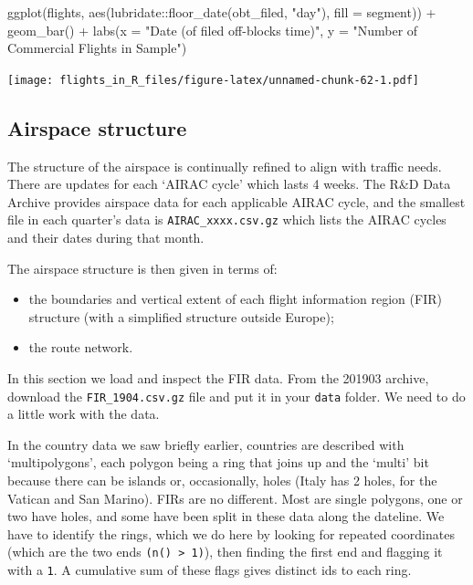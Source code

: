 \documentclass[
]{book}
\newenvironment{Shaded}{\begin{snugshade}}{\end{snugshade}}
\newcommand{\AttributeTok}[1]{\textcolor[rgb]{0.77,0.63,0.00}{#1}}
\newcommand{\FunctionTok}[1]{\textcolor[rgb]{0.00,0.00,0.00}{#1}}
\newcommand{\NormalTok}[1]{#1}
\newcommand{\SpecialCharTok}[1]{\textcolor[rgb]{0.00,0.00,0.00}{#1}}
\newcommand{\StringTok}[1]{\textcolor[rgb]{0.31,0.60,0.02}{#1}}
\providecommand{\tightlist}{%
  \setlength{\itemsep}{0pt}\setlength{\parskip}{0pt}}
\begin{document}
\begin{Shaded}
\begin{Highlighting}[]
\FunctionTok{ggplot}\NormalTok{(flights,}
       \FunctionTok{aes}\NormalTok{(lubridate}\SpecialCharTok{::}\FunctionTok{floor\_date}\NormalTok{(obt\_filed, }\StringTok{"day"}\NormalTok{),}
           \AttributeTok{fill =}\NormalTok{ segment)) }\SpecialCharTok{+} 
  \FunctionTok{geom\_bar}\NormalTok{() }\SpecialCharTok{+}
  \FunctionTok{labs}\NormalTok{(}\AttributeTok{x =} \StringTok{"Date (of filed off{-}blocks time)"}\NormalTok{, }
       \AttributeTok{y =} \StringTok{"Number of Commercial Flights in Sample"}\NormalTok{) }
\end{Highlighting}
\end{Shaded}

\texttt{[image: flights\_in\_R\_files/figure-latex/unnamed-chunk-62-1.pdf]}

\hypertarget{airspaceData}{%
\subsection{Airspace structure}\label{airspaceData}}

The structure of the airspace is continually refined to align with traffic needs. There are updates for each `AIRAC cycle' which lasts 4 weeks. The R\&D Data Archive provides airspace data for each applicable AIRAC cycle, and the smallest file in each quarter's data is \texttt{AIRAC\_xxxx.csv.gz} which lists the AIRAC cycles and their dates during that month.

The airspace structure is then given in terms of:

\begin{itemize}
\tightlist
\item
  the boundaries and vertical extent of each flight information region (FIR) structure (with a simplified structure outside Europe);
\item
  the route network.
\end{itemize}

In this section we load and inspect the FIR data. From the 201903 archive, download the \texttt{FIR\_1904.csv.gz} file and put it in your \texttt{data} folder. We need to do a little work with the data.

In the country data we saw briefly earlier, countries are described with `multipolygons', each polygon being a ring that joins up and the `multi' bit because there can be islands or, occasionally, holes (Italy has 2 holes, for the Vatican and San Marino). FIRs are no different. Most are single polygons, one or two have holes, and some have been split in these data along the dateline. We have to identify the rings, which we do here by looking for repeated coordinates (which are the two ends \texttt{(n()\ \textgreater{}\ 1)}), then finding the first end and flagging it with a \texttt{1}. A cumulative sum of these flags gives distinct ids to each ring.
\end{document}
